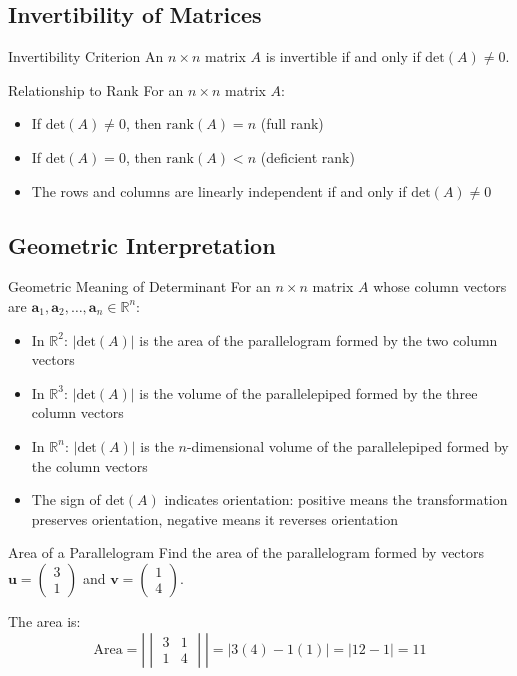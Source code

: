 \documentclass[12pt,a4paper]{article}
\newcommand{\R}{\mathbb{R}}
\newcommand{\vv}[1]{\mathbf{#1}}
\newcommand{\rank}{\text{rank}}
\newcommand{\Det}{\text{det}}
\begin{document}
	\subsection{Invertibility of Matrices}
	
	\begin{theorem}{Invertibility Criterion}
		An $n \times n$ matrix $A$ is invertible if and only if $\Det(A) \neq 0$.
	\end{theorem}
	
	\begin{remark}{Relationship to Rank}
		For an $n \times n$ matrix $A$:
		\begin{itemize}
			\item If $\Det(A) \neq 0$, then $\rank(A) = n$ (full rank)
			\item If $\Det(A) = 0$, then $\rank(A) < n$ (deficient rank)
			\item The rows and columns are linearly independent if and only if $\Det(A) \neq 0$
		\end{itemize}
	\end{remark}
	
	\subsection{Geometric Interpretation}
	
	\begin{definition}{Geometric Meaning of Determinant}
		For an $n \times n$ matrix $A$ whose column vectors are $\vv{a}_1, \vv{a}_2, \ldots, \vv{a}_n \in \R^n$:
		\begin{itemize}
			\item In $\R^2$: $|\Det(A)|$ is the area of the parallelogram formed by the two column vectors
			\item In $\R^3$: $|\Det(A)|$ is the volume of the parallelepiped formed by the three column vectors
			\item In $\R^n$: $|\Det(A)|$ is the $n$-dimensional volume of the parallelepiped formed by the column vectors
			\item The sign of $\Det(A)$ indicates orientation: positive means the transformation preserves orientation, negative means it reverses orientation
		\end{itemize}
	\end{definition}
	
	\begin{example}{Area of a Parallelogram}
		Find the area of the parallelogram formed by vectors $\vv{u} = \begin{pmatrix} 3 \\ 1 \end{pmatrix}$ and $\vv{v} = \begin{pmatrix} 1 \\ 4 \end{pmatrix}$.
		
		The area is:
		\[
		\text{Area} = \left| \begin{vmatrix} 3 & 1 \\ 1 & 4 \end{vmatrix} \right| = |3(4) - 1(1)| = |12 - 1| = 11
		\]
	\end{example}
	
\end{document}
